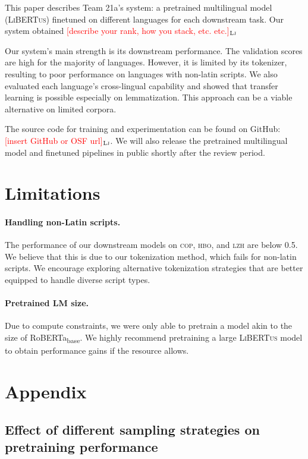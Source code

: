 \documentclass[11pt]{article}
\newcommand{\draftonly}[1]{#1}
\newcommand{\draftcomment}[3]{\draftonly{\textcolor{#2}{[#3]{$_{\textsc{#1}}$}}}}
\newcommand{\lj}[1]{\draftcomment{Lj}{red}{#1}}
\newcommand{\libertus}{\textsc{LiBERTus}}
\begin{document}
This paper describes Team 21a's system: a pretrained multilingual model (\libertus{}) finetuned on different languages for each downstream task.
Our system obtained \lj{describe your rank, how you stack, etc. etc.}

Our system's main strength is its downstream performance.
The validation scores are high for the majority of languages.
However, it is limited by its tokenizer, resulting to poor performance on languages with non-latin scripts.
We also evaluated each language's cross-lingual capability and showed that transfer learning is possible especially on lemmatization.
This approach can be a viable alternative on limited corpora.

The source code for training and experimentation can be found on GitHub: \lj{insert GitHub or OSF url}.
We will also release the pretrained multilingual model and finetuned pipelines in public shortly after the review period.

\section*{Limitations}

\paragraph{Handling non-Latin scripts.}
The performance of our downstream models on \textsc{cop}, \textsc{hbo}, and \textsc{lzh} are below 0.5.
We believe that this is due to our tokenization method, which fails for non-latin scripts.
We encourage exploring alternative tokenization strategies that are better equipped to handle diverse script types.

\paragraph{Pretrained LM size.}
Due to compute constraints, we were only able to pretrain a model akin to the size of RoBERTa\textsubscript{base}.
We highly recommend pretraining a large \libertus{} model to obtain performance gains if the resource allows.




\appendix

\section{Appendix}
\label{sec:appendix}

\subsection{Effect of different sampling strategies on pretraining performance}
\end{document}
